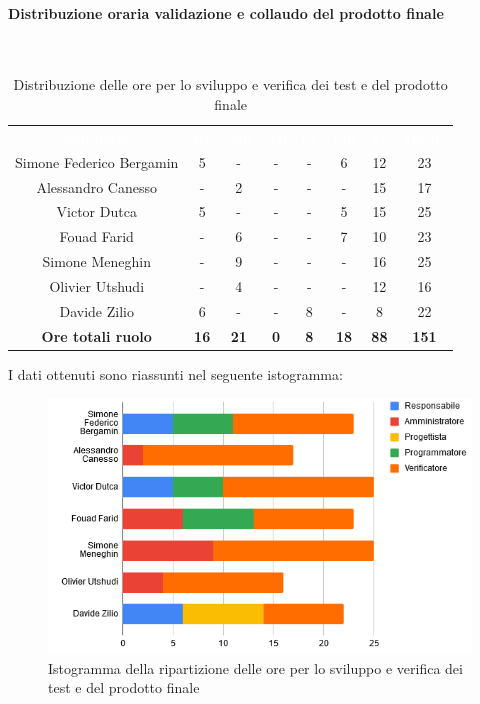 \paragraph{Distribuzione oraria validazione e collaudo del prodotto finale}\mbox{} \\
\begin{table}[H]
\centering\renewcommand{\arraystretch}{1.5}
\caption{Distribuzione delle ore per lo sviluppo e verifica dei test e del prodotto finale}
\vspace{0.2cm}
\begin{tabular}{ c c c c c c c c }
\rowcolor{redafk}
\textcolor{white}{\textbf{Nominativo}} & \textcolor{white}{\textbf{Re}} &
\textcolor{white}{\textbf{Am}} & \textcolor{white}{\textbf{An}} &
\textcolor{white}{\textbf{Pt}} & \textcolor{white}{\textbf{Pm}} &
\textcolor{white}{\textbf{Ve}} & \textcolor{white}{\textbf{Totale}} \\
Simone Federico Bergamin & 5 & - & - & - & 6 & 12 & 23 \\
Alessandro Canesso & - & 2 & - & - & - & 15 & 17\\
Victor Dutca & 5 & - & - & - & 5 & 15 & 25 \\
Fouad Farid & - & 6 & - & - & 7 & 10 & 23 \\
Simone Meneghin & - & 9 & - & - & - & 16 & 25 \\
Olivier Utshudi & - & 4 & - & - & - & 12 & 16 \\
Davide Zilio & 6 & - & - & 8 & - & 8 & 22 \\
\rowcolor{lastrowcolor}
\textbf{Ore totali ruolo} & \textbf{16} & \textbf{21} & \textbf{0} & \textbf{8} & \textbf{18} & \textbf{88} & \textbf{151} \\
\end{tabular}
\end{table}

I dati ottenuti sono riassunti nel seguente istogramma:
\begin{figure}[H]
\centering
\includegraphics[scale=0.60]{img/grafici/tabella_test.png}
\caption{Istogramma della ripartizione delle ore per lo sviluppo e verifica dei test e del prodotto finale}
\end{figure}

